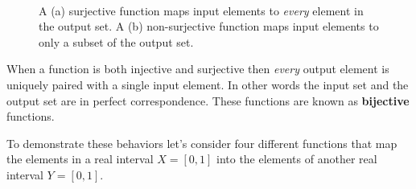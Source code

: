 \documentclass[
  letterpaper,
  DIV=11,
  numbers=noendperiod]{scrartcl}
\begin{document}
\begin{figure}
\begin{minipage}[t]{0.90\linewidth}
{{}

}

\subcaption{\label{fig-non-surjective}}
\end{minipage}%
%
\begin{minipage}[t]{0.05\linewidth}

{\centering 

~

}

\end{minipage}%

\caption{\label{fig-surjectivity}A (a) surjective function maps input
elements to \emph{every} element in the output set. A (b) non-surjective
function maps input elements to only a subset of the output set.}

\end{figure}

When a function is both injective and surjective then \emph{every}
output element is uniquely paired with a single input element. In other
words the input set and the output set are in perfect correspondence.
These functions are known as \textbf{bijective} functions.

To demonstrate these behaviors let's consider four different functions
that map the elements in a real interval \(X = [0, 1]\) into the
elements of another real interval \(Y = [0, 1]\).
\end{document}

